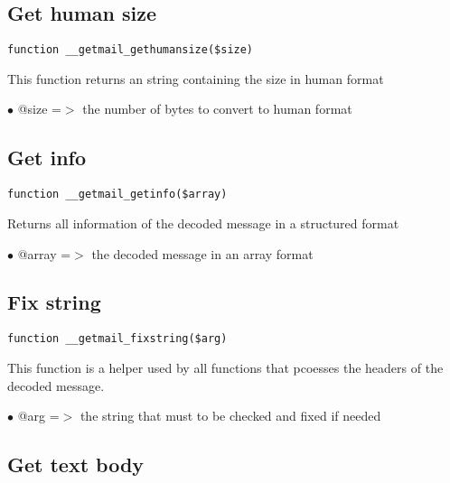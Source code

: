 \documentclass[a4paper]{book}
\begin{document}
\hypertarget{toc543}{}
\subsection{Get human size}

\begin{lstlisting}
function __getmail_gethumansize($size)
\end{lstlisting}

This function returns an string containing the size in human format

\begin{compactitem}
\item[\color{myblue}$\bullet$] @size =$>$ the number of bytes to convert to human format
\end{compactitem}

\hypertarget{toc544}{}
\subsection{Get info}

\begin{lstlisting}
function __getmail_getinfo($array)
\end{lstlisting}

Returns all information of the decoded message in a structured format

\begin{compactitem}
\item[\color{myblue}$\bullet$] @array =$>$ the decoded message in an array format
\end{compactitem}

\hypertarget{toc545}{}
\subsection{Fix string}

\begin{lstlisting}
function __getmail_fixstring($arg)
\end{lstlisting}

This function is a helper used by all functions that pcoesses the headers
of the decoded message.

\begin{compactitem}
\item[\color{myblue}$\bullet$] @arg =$>$ the string that must to be checked and fixed if needed
\end{compactitem}

\hypertarget{toc546}{}
\subsection{Get text body}
\end{document}

